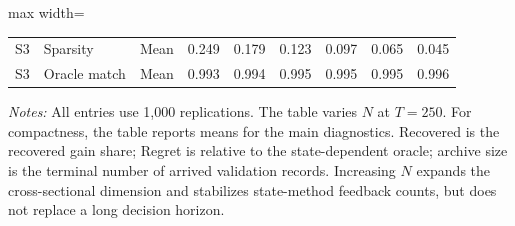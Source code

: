 \documentclass[a4paper,12pt]{article}
\newcommand{\1}{\mathbf{1}}
\newcommand{\ExhibitNote}[1]{\begin{minipage}{0.94\textwidth}\footnotesize\emph{Notes:} #1\end{minipage}}
\begin{document}
\begin{landscape}
\begin{table}[p]
\begin{adjustbox}{max width=\linewidth}
\begin{tabular}{@{}lllrrrrrr@{}}
S3 & Sparsity & Mean & 0.249 & 0.179 & 0.123 & 0.097 & 0.065 & 0.045 \\
S3 & Oracle match & Mean & 0.993 & 0.994 & 0.995 & 0.995 & 0.995 & 0.996 \\
\bottomrule
\end{tabular}
\end{adjustbox}
\par\medskip
\ExhibitNote{All entries use 1,000 replications. The table varies $N$ at $T=250$. For compactness, the table reports means for the main diagnostics. Recovered is the recovered gain share; Regret is relative to the state-dependent oracle; archive size is the terminal number of arrived validation records. Increasing $N$ expands the cross-sectional dimension and stabilizes state-method feedback counts, but does not replace a long decision horizon.}
\end{table}
\end{landscape}
\end{document}
